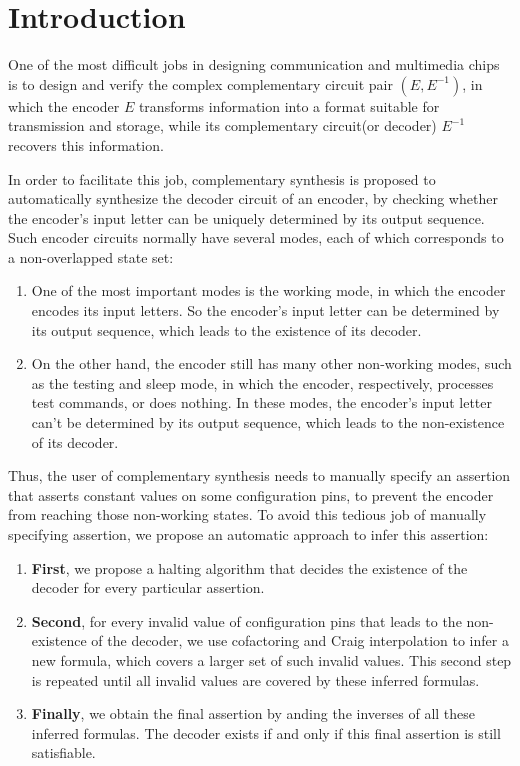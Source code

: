 \documentclass{acm_proc_article-sp}
\begin{document}
\section{Introduction}\label{sec_intro}

One of the most difficult jobs in designing communication and multimedia chips
is to design and verify the complex complementary circuit pair $(E,E^{-1})$,
in which the encoder $E$ transforms information into a format suitable for transmission and storage,
while its complementary circuit(or decoder) $E^{-1}$ recovers this information.

In order to facilitate this job,
complementary synthesis \cite{ShengYuShen:iccad09,ShengYuShen:tcad} is proposed
to automatically synthesize the decoder circuit of an encoder,
by checking whether the encoder's input letter can be uniquely determined by its output sequence.
Such encoder circuits normally have several modes,
each of which corresponds to a non-overlapped state set:

\begin{enumerate}
\item One of the most important modes is the working mode,
in which the encoder encodes its input letters.
So the encoder's input letter can be determined by its output sequence,
which leads to the existence of its decoder.
\item On the other hand,
the encoder still has many other non-working modes,
such as the testing and sleep mode,
in which the encoder,
respectively,
processes test commands,
or does nothing.
In these modes,
the encoder's input letter can't be determined by its output sequence,
which leads to the non-existence of its decoder.
\end{enumerate}

Thus,
the user of complementary synthesis needs to manually specify an assertion that asserts constant values on some configuration pins,
to prevent the encoder from reaching those non-working states.
To avoid this tedious job of manually specifying assertion,
we propose an automatic approach to infer this assertion:
\begin{enumerate}
 \item \textbf{First},
we propose a halting algorithm that decides the existence of the decoder for every particular assertion.
 \item \textbf{Second},
for every invalid value of configuration pins that leads to the non-existence of the decoder,
we use cofactoring\cite{Cofact} and Craig interpolation\cite{Craig} to infer a new formula,
which covers a larger set of such invalid values.
This second step is repeated until all invalid values are covered by these inferred formulas.
 \item \textbf{Finally},
we obtain the final assertion by anding the inverses of all these inferred formulas.
The decoder exists if and only if this final assertion is still satisfiable.
\end{enumerate}
\end{document}
